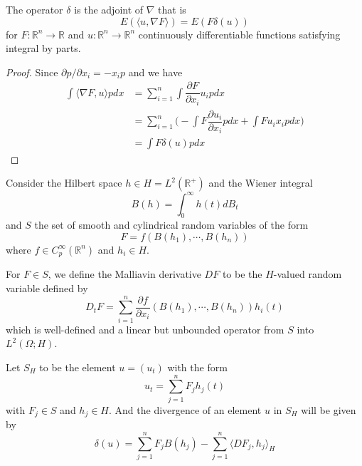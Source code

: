 \documentclass[lang=en, color=blue, ]{elegantbook}
\newcommand{\R}{\mathbb{R}}
\begin{document}
\begin{proposition}
    The operator $\delta$ is the adjoint of $\nabla$ that is
    \[
    E(\langle u, \nabla F\rangle) = E(F\delta (u))
    \]
    for $F:\R^n \to \R$ and $u: \R^n \to \R^n$ continuously differentiable functions satisfying integral by parts.
\end{proposition}
\begin{proof}
    Since $\partial p/\partial x_i = - x_i p $ and we have
    \[
    \begin{aligned}
    \int \langle \nabla F,u\rangle pdx  &=\sum\limits_{i=1}^n \int \dfrac{\partial F}{\partial x_i} u_i pdx \\
    & = \sum\limits_{i=1}^n \Big(-\int F\dfrac{\partial u_i }{\partial x_i} pdx + \int Fu_i x_i p dx\Big) \\ &= \int F\delta (u) pdx
    \end{aligned}
    \]
\end{proof}

\begin{definition}
    Consider the Hilbert space $h \in H = L^2(\R^+)$ and the Wiener integral
    \[
    B(h) = \int_0^{\infty} h(t)dB_t
    \]
    and $S$ the set of smooth and cylindrical random variables of the form
    \[
    F = f(B(h_1),\cdots,B(h_n))
    \]
    where $f\in C_p^{\infty}(\R^n)$ and $h_i \in H$.
\end{definition}

\begin{definition}
    For $F \in S$, we define the Malliavin derivative $DF$ to be the $H$-valued random variable defined by
    \[
    D_tF = \sum\limits_{i=1}^n \dfrac{\partial f}{\partial x_i}(B(h_1),\cdots,B(h_n))h_i(t)
    \]
    which is well-defined and a linear but unbounded operator from $S$ into $L^2(\Omega;H)$.\par
    Let $S_H$ to be the element $u = (u_t)$ with the form
    \[
    u_t = \sum\limits_{j=1}^n F_jh_j(t)
    \]
    with $F_j \in S$ and $h_j \in H$. And the divergence of an element $u$ in $S_H$ will be given by
    \[
    \delta(u) = \sum\limits_{j=1}^nF_j B(h_j) - \sum\limits_{j=1}^n \langle DF_j, h_j\rangle_H
    \]
\end{definition}
\end{document}
